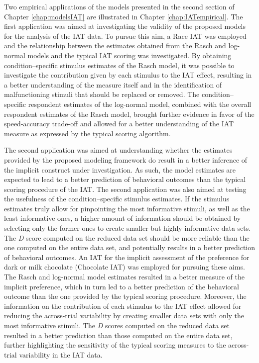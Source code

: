 \documentclass[12pt]{book}
\begin{document}
	Two empirical applications of the models presented in the second section of Chapter \ref{chap:modelsIAT} are illustrated in Chapter \ref{chap:IATempirical}.
	The first application was aimed at investigating the validity of the proposed models for the analysis of the IAT data. To pursue this aim, a Race IAT was employed and the relationship between the estimates obtained from the Rasch and log-normal models and the typical IAT scoring was investigated. By obtaining condition--specific stimulus estimates of the Rasch model, it was possible to investigate the contribution given by each stimulus to the IAT effect, resulting in a better understanding of the measure itself and in the identification of  malfunctioning stimuli that should be replaced or removed. The condition--specific respondent estimates of the log-normal model, combined with the overall respondent estimates of the Rasch model, brought further evidence in favor of the speed-accuracy trade-off and allowed for a better understanding of the IAT measure as expressed by the typical scoring algorithm. 
	
	The second application was aimed at understanding whether the estimates provided by the proposed modeling framework do result in a better inference of the implicit construct under investigation. As such, the model estimates are expected to lead to a better prediction of behavioral outcomes than the typical scoring procedure of the IAT. 
	The second application was also aimed at testing the usefulness of the condition--specific stimulus estimates. If the stimulus estimates truly allow for pinpointing the most informative stimuli, as well as the least informative ones, a higher amount of information should be obtained by selecting only the former ones to create smaller but highly informative data sets. The \emph{D} score computed on the reduced data set should be more reliable than the one computed on the entire data set, and  potentially results in a better prediction of behavioral outcomes.  
	An IAT for the implicit assessment of the preference for dark or milk chocolate (Chocolate IAT) was employed for pursuing these aims. 
	The Rasch and log-normal model estimates resulted in a better measure of the implicit preference, which in turn led to a better prediction of the behavioral outcome than the one provided by the typical scoring procedure. 
	Moreover, the information on the contribution of each stimulus to the IAT effect allowed  for reducing the across-trial variability by creating smaller data sets with only the most informative stimuli. 
	The \emph{D} scores computed on the reduced data set resulted in a better prediction than those computed on the entire data set, further highlighting the sensitivity of the typical scoring measures to the across-trial variability in the IAT data. 
\end{document}
